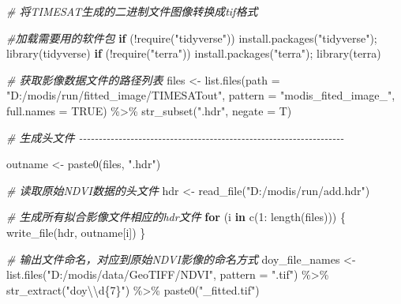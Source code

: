 \documentclass[
]{article}
\newenvironment{Shaded}{\begin{snugshade}}{\end{snugshade}}
\newcommand{\AttributeTok}[1]{\textcolor[rgb]{0.77,0.63,0.00}{#1}}
\newcommand{\CommentTok}[1]{\textcolor[rgb]{0.56,0.35,0.01}{\textit{#1}}}
\newcommand{\ConstantTok}[1]{\textcolor[rgb]{0.00,0.00,0.00}{#1}}
\newcommand{\ControlFlowTok}[1]{\textcolor[rgb]{0.13,0.29,0.53}{\textbf{#1}}}
\newcommand{\DecValTok}[1]{\textcolor[rgb]{0.00,0.00,0.81}{#1}}
\newcommand{\FunctionTok}[1]{\textcolor[rgb]{0.00,0.00,0.00}{#1}}
\newcommand{\NormalTok}[1]{#1}
\newcommand{\OtherTok}[1]{\textcolor[rgb]{0.56,0.35,0.01}{#1}}
\newcommand{\SpecialCharTok}[1]{\textcolor[rgb]{0.00,0.00,0.00}{#1}}
\newcommand{\StringTok}[1]{\textcolor[rgb]{0.31,0.60,0.02}{#1}}
\begin{document}
\begin{Shaded}
\begin{Highlighting}[]
\CommentTok{\# 将TIMESAT生成的二进制文件图像转换成tif格式}

\CommentTok{\#加载需要用的软件包}
\ControlFlowTok{if}\NormalTok{ (}\SpecialCharTok{!}\FunctionTok{require}\NormalTok{(}\StringTok{"tidyverse"}\NormalTok{)) }\FunctionTok{install.packages}\NormalTok{(}\StringTok{"tidyverse"}\NormalTok{); }\FunctionTok{library}\NormalTok{(tidyverse)}
\ControlFlowTok{if}\NormalTok{ (}\SpecialCharTok{!}\FunctionTok{require}\NormalTok{(}\StringTok{"terra"}\NormalTok{)) }\FunctionTok{install.packages}\NormalTok{(}\StringTok{"terra"}\NormalTok{); }\FunctionTok{library}\NormalTok{(terra)}

\CommentTok{\# 获取影像数据文件的路径列表}
\NormalTok{files }\OtherTok{\textless{}{-}} \FunctionTok{list.files}\NormalTok{(}\AttributeTok{path =} \StringTok{"D:/modis/run/fitted\_image/TIMESATout"}\NormalTok{,}
                    \AttributeTok{pattern =} \StringTok{"modis\_fited\_image\_"}\NormalTok{,}
                    \AttributeTok{full.names =} \ConstantTok{TRUE}\NormalTok{) }\SpecialCharTok{\%\textgreater{}\%}
  \FunctionTok{str\_subset}\NormalTok{(}\StringTok{".hdr"}\NormalTok{, }\AttributeTok{negate =}\NormalTok{ T)}

\CommentTok{\# 生成头文件 {-}{-}{-}{-}{-}{-}{-}{-}{-}{-}{-}{-}{-}{-}{-}{-}{-}{-}{-}{-}{-}{-}{-}{-}{-}{-}{-}{-}{-}{-}{-}{-}{-}{-}{-}{-}{-}{-}{-}{-}{-}{-}{-}{-}{-}{-}{-}{-}{-}{-}{-}{-}{-}{-}{-}{-}{-}{-}{-}{-}{-}{-}{-}{-}{-}{-}{-}}

\NormalTok{outname }\OtherTok{\textless{}{-}} \FunctionTok{paste0}\NormalTok{(files, }\StringTok{".hdr"}\NormalTok{)}

\CommentTok{\# 读取原始NDVI数据的头文件}
\NormalTok{hdr }\OtherTok{\textless{}{-}} \FunctionTok{read\_file}\NormalTok{(}\StringTok{"D:/modis/run/add.hdr"}\NormalTok{)}

\CommentTok{\# 生成所有拟合影像文件相应的hdr文件}
\ControlFlowTok{for}\NormalTok{ (i }\ControlFlowTok{in} \FunctionTok{c}\NormalTok{(}\DecValTok{1}\SpecialCharTok{:} \FunctionTok{length}\NormalTok{(files))) \{}
  \FunctionTok{write\_file}\NormalTok{(hdr, outname[i])}
\NormalTok{\}}

\CommentTok{\# 输出文件命名，对应到原始NDVI影像的命名方式}
\NormalTok{doy\_file\_names }\OtherTok{\textless{}{-}} \FunctionTok{list.files}\NormalTok{(}\StringTok{"D:/modis/data/GeoTIFF/NDVI"}\NormalTok{, }\AttributeTok{pattern =} \StringTok{".tif"}\NormalTok{) }\SpecialCharTok{\%\textgreater{}\%} 
  \FunctionTok{str\_extract}\NormalTok{(}\StringTok{"doy}\SpecialCharTok{\textbackslash{}\textbackslash{}}\StringTok{d\{7\}"}\NormalTok{) }\SpecialCharTok{\%\textgreater{}\%} \FunctionTok{paste0}\NormalTok{(}\StringTok{"\_fitted.tif"}\NormalTok{)}


\end{Highlighting}
\end{Shaded}
\end{document}
